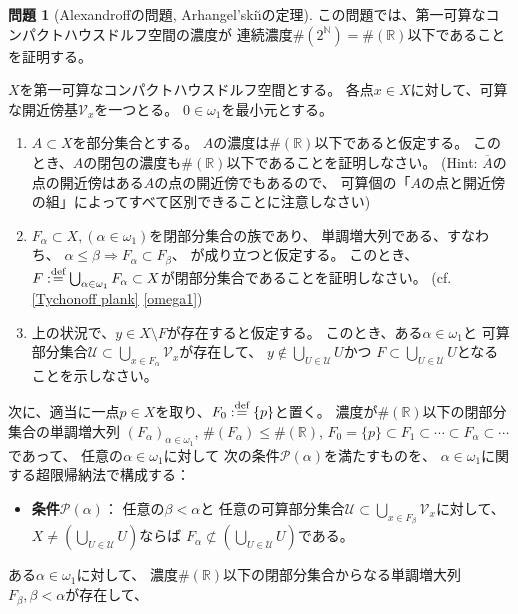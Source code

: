 \documentclass[uplatex]{jsarticle}
\theoremstyle{definition}
\newtheorem{prob}[prob]{問題}
\newcommand{\dfn}{:\overset{\mbox{{\scriptsize def}}}{=}}
\newcommand{\R}{\mathbb{R}}
\newcommand{\N}{\mathbb{N}}
\newcommand{\mcU}{\mathcal{U}}
\newcommand{\mcV}{\mathcal{V}}
\begin{document}
\begin{prob}[Alexandroffの問題, Arhangel'ski\u{\i}の定理]
  この問題では、第一可算なコンパクトハウスドルフ空間の濃度が
  連続濃度\(\#(2^{\N}) = \#(\R)\)以下であることを証明する。

  \(X\)を第一可算なコンパクトハウスドルフ空間とする。
  各点\(x\in X\)に対して、可算な開近傍基\(\mcV_x\)を一つとる。
  \(0\in \omega_1\)を最小元とする。
  \begin{enumerate}
    \item
    \(A\subset X\)を部分集合とする。
    \(A\)の濃度は\(\#(\R)\)以下であると仮定する。
    このとき、\(A\)の閉包の濃度も\(\#(\R)\)以下であることを証明しなさい。
    (Hint: \(\overline{A}\)の点の開近傍はある\(A\)の点の開近傍でもあるので、
    可算個の「\(A\)の点と開近傍の組」によってすべて区別できることに注意しなさい)
    \item
    \(F_{\alpha}\subset X, (\alpha \in \omega_1)\)を閉部分集合の族であり、
    単調増大列である、すなわち、
    \(\alpha \leq \beta \Rightarrow F_{\alpha} \subset F_{\beta}\)、
    が成り立つと仮定する。
    このとき、\(F\dfn \bigcup_{\alpha\in \omega_1}F_{\alpha}\subset X\)が閉部分集合であることを証明しなさい。
    (cf. \autoref{Tychonoff plank} \ref{omega1})
    \item
    上の状況で、\(y\in X\setminus F\)が存在すると仮定する。
    このとき、ある\(\alpha \in \omega_1\)と
    可算部分集合\(\mcU\subset \bigcup_{x\in F_{\alpha}}\mcV_x\)が存在して、
    \(y\not\in \bigcup_{U\in \mcU}U\)かつ
    \(F\subset \bigcup_{U\in \mcU}U\)となることを示しなさい。
  \end{enumerate}
  次に、適当に一点\(p\in X\)を取り、\(F_0\dfn \{p\}\)と置く。
  濃度が\(\#(\R)\)以下の閉部分集合の単調増大列
  \((F_{\alpha})_{\alpha\in\omega_1}\),
  \(\#(F_{\alpha})\leq \#(\R)\),
  \(F_0 = \{p\} \subset F_1\subset \cdots \subset F_{\alpha}\subset \cdots\)であって、
  任意の\(\alpha\in \omega_1\)に対して
  次の条件\(\mathscr{P}(\alpha)\)を満たすものを、
  \(\alpha\in \omega_1\)に関する超限帰納法で構成する：
  \begin{itemize}
    \item
    \textbf{条件}\(\mathscr{P}(\alpha)\)：
    任意の\(\beta < \alpha\)と
    任意の可算部分集合\(\mcU\subset \bigcup_{x\in F_{\beta}}\mcV_x\)に対して、
    \(X\neq \left(\bigcup_{U\in \mcU} U\right)\)ならば
    \(F_{\alpha}\not\subset \left(\bigcup_{U\in \mcU} U\right)\)である。
  \end{itemize}
  ある\(\alpha\in \omega_1\)に対して、
  濃度\(\#(\R)\)以下の閉部分集合からなる単調増大列\(F_{\beta},\beta < \alpha\)が存在して、

\end{prob}
\end{document}
